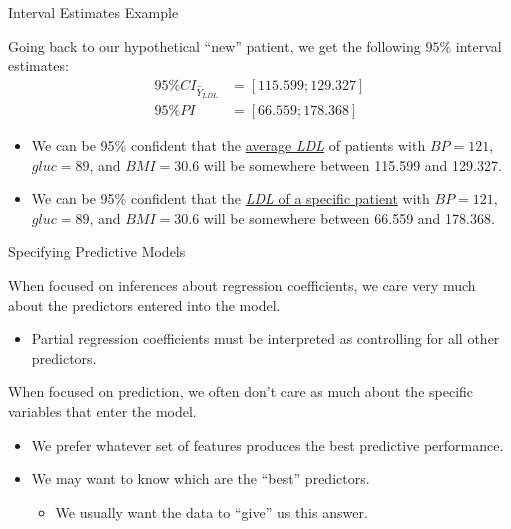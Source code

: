 \documentclass{beamer}\usepackage[]{graphicx}\usepackage[]{color}
\begin{document}

\begin{frame}{Interval Estimates Example}
  
  Going back to our hypothetical ``new'' patient, we get the following $95\%$ 
  interval estimates:
  \begin{align*}
    95\% CI_{\hat{Y}_{LDL}} &= [115.599; 129.327]\\[8pt]
    95\% PI &= [66.559; 178.368]
  \end{align*}
  \begin{itemize}
  \item We can be 95\% confident that the \underline{average \emph{LDL}} of 
    patients with $BP = 121$, $gluc = 89$, and $BMI = 30.6$
    will be somewhere between 115.599 and 129.327.
    \vb
  \item We can be 95\% confident that the \underline{\emph{LDL} of a specific 
    patient} with $BP = 121$, $gluc = 89$, and $BMI = 30.6$
    will be somewhere between 66.559 and 178.368.
  \end{itemize}
  
\end{frame}


\begin{frame}{Specifying Predictive Models}
  
  When focused on inferences about regression coefficients, we care very much
  about the predictors entered into the model.  
  \vb
  \begin{itemize}
  \item Partial regression coefficients must be interpreted as controlling for
    all other predictors. 
  \end{itemize}
  \vb
  \pause
  When focused on prediction, we often don't care as much about the
  specific variables that enter the model.  
  \vb
  \begin{itemize}
  \item We prefer whatever set of features produces the best predictive
    performance.  
    \vb
  \item We may want to know which are the ``best'' predictors.
    \vc
    \begin{itemize}
    \item We usually want the data to ``give'' us this answer.
    \end{itemize}
  \end{itemize}
  
\end{frame}
\end{document}

